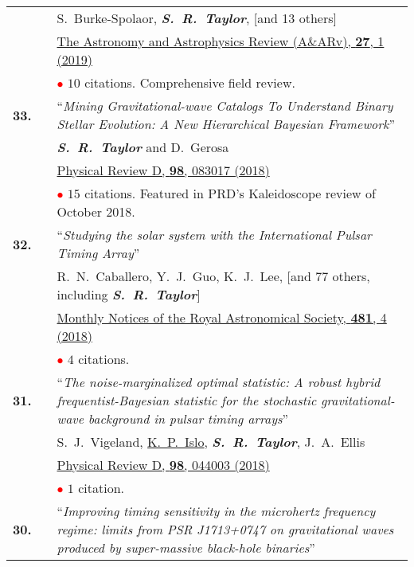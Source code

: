 \documentclass[11pt,letterpaper,sans]{moderncv}
\begin{document}
{\begin{longtable}{rp{0.3cm}p{15.8cm}}
&&S.~Burke-Spolaor, \textit{\textbf{S.~R.~Taylor}}, [and 13 others] \\
&& \href{https://arxiv.org/abs/1811.08826}{{\color{color1} The Astronomy and Astrophysics Review (A\&ARv), \textbf{27}, 1 (2019)}} \\
&& \textcolor{red}{$\bullet$} $10$ citations. Comprehensive field review. \vspace{0.09cm}\\
\textbf{33.} & & ``\textit{Mining Gravitational-wave Catalogs To Understand Binary Stellar Evolution: A New Hierarchical Bayesian Framework}'' \\ 
&&\textit{\textbf{S.~R.~Taylor}} and D.~Gerosa \\
&& \href{https://journals.aps.org/prd/abstract/10.1103/PhysRevD.98.083017}{{\color{color1} Physical Review D, \textbf{98}, 083017 (2018)}} \\
&& \textcolor{red}{$\bullet$} $15$ citations. Featured in PRD's Kaleidoscope review of October 2018. \vspace{0.09cm}\\
\textbf{32.} & & ``\textit{Studying the solar system with the International Pulsar Timing Array}'' \\ 
&&R.~N.~Caballero, Y.~J.~Guo, K.~J.~Lee, [and 77 others, including  \textit{\textbf{S.~R.~Taylor}}]\\
&& \href{https://academic.oup.com/mnras/article-abstract/481/4/5501/5113478?redirectedFrom=fulltext}{{\color{color1} Monthly Notices of the Royal Astronomical Society, \textbf{481}, 4 (2018)}}  \\
&& \textcolor{red}{$\bullet$} $4$ citations. \vspace{0.09cm}\\
\textbf{31.} & & ``\textit{The noise-marginalized optimal statistic: A robust hybrid frequentist-Bayesian statistic for the stochastic gravitational-wave background in pulsar timing arrays}'' \\ 
&&S.~J.~Vigeland, \underline{K.~P.~Islo}, \textit{\textbf{S.~R.~Taylor}}, J.~A.~Ellis \\
&& \href{https://journals.aps.org/prd/abstract/10.1103/PhysRevD.98.044003}{{\color{color1} Physical Review D, \textbf{98}, 044003 (2018)}}  \\
&& \textcolor{red}{$\bullet$} $1$ citation. \vspace{0.09cm}\\
\textbf{30.} & & ``\textit{Improving timing sensitivity in the microhertz frequency regime: limits from PSR J1713+0747 on gravitational waves produced by super-massive black-hole binaries}'' \\ 

\end{longtable}}
\end{document}

